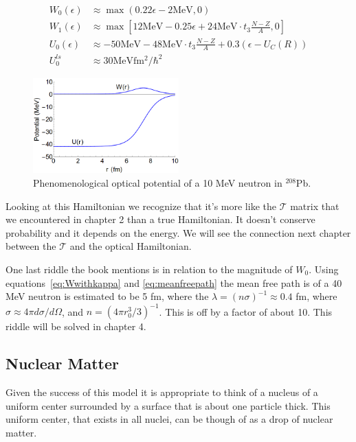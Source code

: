 \documentclass[12pt]{extarticle}
\begin{document}
\begin{align}
   W_0(\epsilon) &\approx \max (0.22\epsilon - 2\mathrm{MeV},0) \\
   W_1(\epsilon) &\approx \max \left[12\mathrm{MeV} - 0.25\epsilon + 24\mathrm{MeV} \cdot t_3\frac{N-Z}{A},0\right] \\
   U_0(\epsilon) &\approx -50\mathrm{MeV}-48\mathrm{MeV}\cdot t_3\frac{N-Z}{A}+0.3(\epsilon-U_C(R)) \\
   U_0^{ls} &\approx 30\mathrm{MeV fm^2/\hbar^2}
\end{align}
\begin{figure}[h]
   \centering
   \includegraphics[width=0.5\textwidth]{fig3_3.png}
   \caption{Phenomenological optical potential of a 10 MeV neutron in ${}^{208}$Pb.}
   \label{fig:phenpot}
\end{figure}

Looking at this Hamiltonian we recognize that it's more like the $\mathcal{T}$ matrix that we encountered in chapter 2 than a true Hamiltonian. It doesn't conserve probability and it depends on the energy. We will see the connection next chapter between the $\mathcal{T}$ and the optical Hamiltonian.

One last riddle the book mentions is in relation to the magnitude of $W_0$. Using equations~\ref{eq:Wwithkappa} and \ref{eq:meanfreepath} the mean free path is of a 40 MeV neutron is estimated to be 5 fm, where the $\lambda = (n\sigma)^{-1} \approx 0.4$ fm, where $\sigma \approx 4\pi d\sigma/d\Omega$, and $n=(4\pi r_0^3/3)^{-1}$. This is off by a factor of about 10. This riddle will be solved in chapter 4.

\subsection{Nuclear Matter}
Given the success of this model it is appropriate to think of a nucleus of a uniform center surrounded by a surface that is about one particle thick. This uniform center, that exists in all nuclei, can be though of as a drop of nuclear matter.
\end{document}
